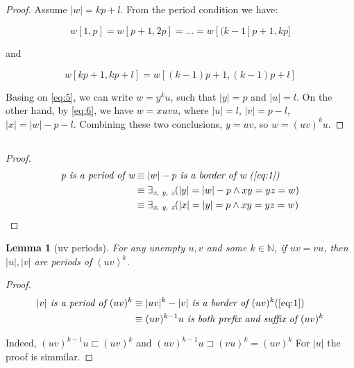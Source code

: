 \documentclass{scrartcl}
\newtheorem{lema}{Lemma}
\begin{document}
  \subsection{}
    \begin{proof}
      Assume $|w| = kp + l$. From the period condition we have:
      
      \begin{equation}\label{eq:5}
        w[1, p] = w[p + 1, 2p] = \dots = w[(k - 1]p + 1, kp]
      \end{equation}
      
      and
      
      \begin{equation}\label{eq:6}
        w[kp + 1, kp + l] = w[(k - 1)p + 1, (k - 1)p + l]
      \end{equation}
      
      Basing on \ref{eq:5}, we can write $w = y^ku$, such that $|y| = p$ and $|u| = l$. On the other hand, by \ref{eq:6}, we have $w = xuvu$, where $|u| = l$, $|v| = p - l$, $|x| = |w| - p - l$. Combining these two conclusions, 
$y = uv$, so $w = (uv)^ku$.
    \end{proof}
    
  \subsection{}
    \begin{proof}
      \begin{equation}
        \begin{split}
          \textit{p is a period of w} &\equiv |w| - p \textit{ is a border of w (\ref{eq:1})} \\ &\equiv  \exists_\textit{x, y, z}(|y| = |w| - p \land xy = yz = w) \\ &\equiv \exists_\textit{x, y, z}(|x| = |y| = p \land xy = yz = 
w)
        \end{split}
      \end{equation}
    \end{proof}
    
    \begin{lema}[uv periods]\label{lemma:10}
       For any unempty $u, v$ and some $k \in \mathbb{N}$, if $uv = vu$, then $|u|,|v|$ are periods of $(uv)^k$.
    \end{lema}
    \begin{proof}
      \begin{equation}
        \begin{split}
          |v| \textit{ is a period of } (uv)^k &\equiv |uv|^k - |v| \textit{ is a border of } (uv)^k 
          (\ref{eq:1}) \\ &\equiv (uv)^{k-1}u \textit{ is both prefix and suffix of } (uv)^k
        \end{split}
      \end{equation}
      
      Indeed, $(uv)^{k-1}u \sqsubset (uv)^k$ and $(uv)^{k-1}u \sqsupset (vu)^k = (uv)^k$ For $|u|$ the proof is simmilar.
    \end{proof}
    
\end{document}
